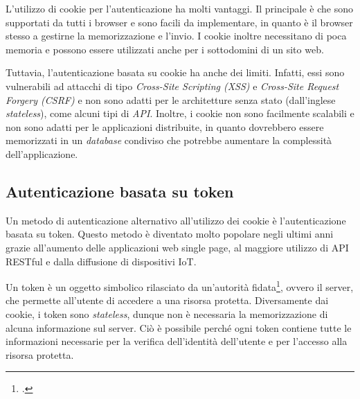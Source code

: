 \noindent L'utilizzo di cookie per l'autenticazione ha molti vantaggi.
Il principale è che sono supportati da tutti i browser e sono facili da implementare, in quanto è il browser stesso a gestirne la memorizzazione e l'invio.
I cookie inoltre necessitano di poca memoria e possono essere utilizzati anche per i sottodomini di un sito web.

Tuttavia, l'autenticazione basata su cookie ha anche dei limiti.
Infatti, essi sono vulnerabili ad attacchi di tipo \emph{Cross-Site Scripting (XSS)} e \emph{Cross-Site Request Forgery (CSRF)} e non sono adatti per le architetture senza stato (dall'inglese \emph{stateless}), come alcuni tipi di \emph{\gls{API}}\glsfirstoccur.
Inoltre, i cookie non sono facilmente scalabili e non sono adatti per le applicazioni distribuite, in quanto dovrebbero essere memorizzati in un \emph{database} condiviso che potrebbe aumentare la complessità dell'applicazione.

\subsection{Autenticazione basata su token}
Un metodo di autenticazione alternativo all'utilizzo dei cookie è l'autenticazione basata su token.
Questo metodo è diventato molto popolare negli ultimi anni grazie all'aumento delle applicazioni web single page, al maggiore utilizzo di API RESTful e dalla diffusione di dispositivi IoT.

Un token è un oggetto simbolico rilasciato da un'autorità fidata\footcite{site:token-based-authentication-cloudflare}, ovvero il server, che permette all'utente di accedere a una risorsa protetta.
Diversamente dai cookie, i token sono \emph{stateless}, dunque non è necessaria la memorizzazione di alcuna informazione sul server.
Ciò è possibile perché ogni token contiene tutte le informazioni necessarie per la verifica dell'identità dell'utente e per l'accesso alla risorsa protetta. \\

